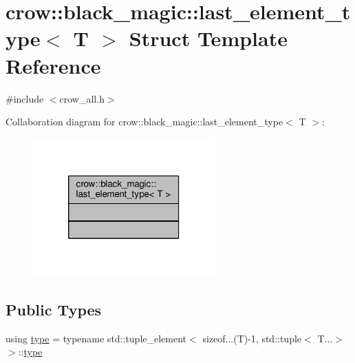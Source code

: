 \hypertarget{structcrow_1_1black__magic_1_1last__element__type}{\section{crow\-:\-:black\-\_\-magic\-:\-:last\-\_\-element\-\_\-type$<$ T $>$ Struct Template Reference}
\label{structcrow_1_1black__magic_1_1last__element__type}
}


{\ttfamily \#include $<$crow\-\_\-all.\-h$>$}



Collaboration diagram for crow\-:\-:black\-\_\-magic\-:\-:last\-\_\-element\-\_\-type$<$ T $>$\-:
\nopagebreak
\begin{figure}[H]
\begin{center}
\leavevmode
\includegraphics[width=198pt]{structcrow_1_1black__magic_1_1last__element__type__coll__graph}
\end{center}
\end{figure}
\subsection*{Public Types}
\begin{DoxyCompactItemize}
\item 
using \hyperlink{structcrow_1_1black__magic_1_1last__element__type_a237aaa063e7286bb4e3fd2286f69dfe2}{type} = typename std\-::tuple\-\_\-element$<$ sizeof...(T)-\/1, std\-::tuple$<$ T...$>$$>$\-::\hyperlink{structcrow_1_1black__magic_1_1last__element__type_a237aaa063e7286bb4e3fd2286f69dfe2}{type}
\end{DoxyCompactItemize}


